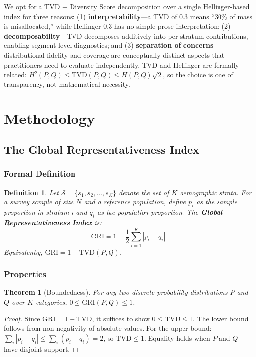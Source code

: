 \documentclass[11pt,a4paper]{article}
\newtheorem{theorem}{Theorem}
\newtheorem{definition}{Definition}
\begin{document}
We opt for a TVD + Diversity Score decomposition over a single Hellinger-based index for three reasons: (1) \textbf{interpretability}---a TVD of 0.3 means ``30\% of mass is misallocated,'' while Hellinger 0.3 has no simple prose interpretation; (2) \textbf{decomposability}---TVD decomposes additively into per-stratum contributions, enabling segment-level diagnostics; and (3) \textbf{separation of concerns}---distributional fidelity and coverage are conceptually distinct aspects that practitioners need to evaluate independently. TVD and Hellinger are formally related: $H^2(P,Q) \leq \text{TVD}(P,Q) \leq H(P,Q)\sqrt{2}$, so the choice is one of transparency, not mathematical necessity.

\section{Methodology}

\subsection{The Global Representativeness Index}

\subsubsection{Formal Definition}

\begin{definition}
Let $\mathcal{S} = \{s_1, s_2, \ldots, s_K\}$ denote the set of $K$ demographic strata. For a survey sample of size $N$ and a reference population, define $p_i$ as the sample proportion in stratum $i$ and $q_i$ as the population proportion. The \textbf{Global Representativeness Index} is:
\begin{equation}\label{eq:gri}
    \text{GRI} = 1 - \frac{1}{2} \sum_{i=1}^{K} |p_i - q_i|
\end{equation}
Equivalently, $\text{GRI} = 1 - \text{TVD}(P, Q)$.
\end{definition}

\subsubsection{Properties}

\begin{theorem}[Boundedness]\label{thm:bounds}
For any two discrete probability distributions $P$ and $Q$ over $K$ categories, $0 \leq \text{GRI}(P, Q) \leq 1$.
\end{theorem}
\begin{proof}
Since $\text{GRI} = 1 - \text{TVD}$, it suffices to show $0 \leq \text{TVD} \leq 1$. The lower bound follows from non-negativity of absolute values. For the upper bound: $\sum_i |p_i - q_i| \leq \sum_i (p_i + q_i) = 2$, so $\text{TVD} \leq 1$. Equality holds when $P$ and $Q$ have disjoint support.
\end{proof}
\end{document}

